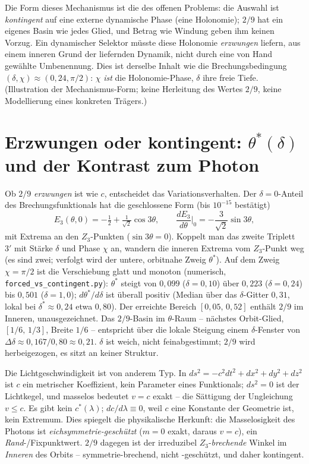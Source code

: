 Die Form dieses Mechanismus ist die des offenen Problems: die Auswahl ist \emph{kontingent} auf
eine externe dynamische Phase (eine Holonomie); $2/9$ hat ein eigenes Basin wie jedes Glied,
und Betrag wie Windung geben ihm keinen Vorzug. Ein dynamischer Selektor müsste diese
Holonomie \emph{erzwungen} liefern, aus einem inneren Grund der liefernden Dynamik, nicht durch
eine von Hand gewählte Umbenennung. Dies ist derselbe Inhalt wie die Brechungsbedingung $(\delta,\chi)\approx(0{,}24,
\pi/2)$: $\chi$ \emph{ist} die Holonomie-Phase, $\delta$ ihre freie Tiefe. (Illustration der
Mechanismus-Form; keine Herleitung des Wertes $2/9$, keine Modellierung eines konkreten
Trägers.)

\section{Erzwungen oder kontingent: $\theta^*(\delta)$ und der Kontrast zum Photon}
Ob $2/9$ \emph{erzwungen} ist wie $c$, entscheidet das Variationsverhalten. Der $\delta=0$-Anteil
des Brechungsfunktionals hat die geschlossene Form (bis $10^{-15}$ bestätigt)
\[
E_3(\theta,0)=-\tfrac12+\tfrac{1}{\sqrt2}\cos 3\theta,\qquad
\frac{dE_3}{d\theta}\Big|_{0}=-\frac{3}{\sqrt2}\sin 3\theta,
\]
mit Extrema an den $Z_3$-Punkten ($\sin3\theta=0$). Koppelt man das zweite Triplett $3'$ mit
Stärke $\delta$ und Phase $\chi$ an, wandern die inneren Extrema vom $Z_3$-Punkt weg (es sind
zwei; verfolgt wird der untere, orbitnahe Zweig $\theta^*$). Auf dem Zweig $\chi=\pi/2$ ist die
Verschiebung glatt und monoton (numerisch,
\texttt{forced\_vs\_contingent.py}): $\theta^*$ steigt von $0{,}099$ ($\delta=0{,}10$) über
$0{,}223$ ($\delta=0{,}24$) bis $0{,}501$ ($\delta=1{,}0$); $d\theta^*/d\delta$ ist überall
positiv (Median über das $\delta$-Gitter $0{,}31$, lokal bei $\delta^*\approx0{,}24$ etwa
$0{,}80$). Der erreichte Bereich $[0{,}05,\,0{,}52]$ enthält $2/9$ im Inneren, unausgezeichnet.
Das $2/9$-Basin im $\theta$-Raum -- nächstes Orbit-Glied, $[1/6,\,1/3]$, Breite $1/6$ --
entspricht über die lokale Steigung einem $\delta$-Fenster von
$\Delta\delta\approx0{,}167/0{,}80\approx0{,}21$. $\delta$ ist weich, nicht feinabgestimmt;
$2/9$ wird herbeigezogen, es sitzt an keiner Struktur.

Die Lichtgeschwindigkeit ist von anderem Typ. In $ds^2=-c^2dt^2+dx^2+dy^2+dz^2$ ist $c$ ein
metrischer Koeffizient, kein Parameter eines Funktionals; $ds^2=0$ ist der Lichtkegel, und
masselos bedeutet $v=c$ exakt -- die Sättigung der Ungleichung $v\le c$. Es gibt kein
$c^*(\lambda)$; $dc/d\lambda\equiv0$, weil $c$ eine Konstante der Geometrie ist, kein Extremum.
Dies spiegelt die physikalische Herkunft: die Masselosigkeit des Photons ist
\emph{eichsymmetrie-geschützt} ($m=0$ exakt, daraus $v=c$), ein \emph{Rand}-/Fixpunktwert.
$2/9$ dagegen ist der irreduzibel $Z_3$-\emph{brechende} Winkel im \emph{Inneren} des Orbits --
symmetrie-brechend, nicht -geschützt, und daher kontingent.


